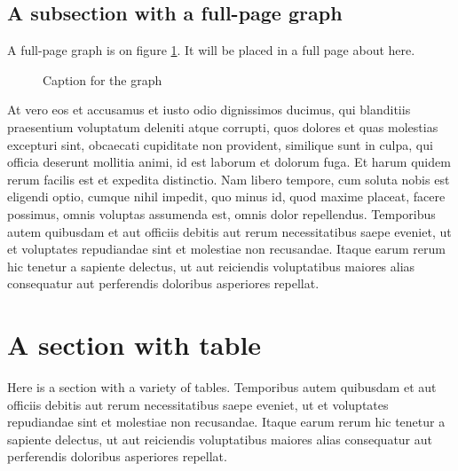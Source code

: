 \documentclass[letterpaper,12pt,leqno]{article}
\newcommand{\pdf}{figures.pdf}
\begin{document}
\subsection{A subsection with a full-page graph}

A full-page graph is on figure \ref{f:graph2}. It will be placed in a full page about here.

\begin{figure}[p]
\hfill
{}\vfig
{}\hfill
{}\vfig
{}\hfill
{}
\caption{Caption for the graph}
\label{f:graph2}\end{figure}

At vero eos et accusamus et iusto odio dignissimos ducimus, qui blanditiis praesentium voluptatum deleniti atque corrupti, quos dolores et quas molestias excepturi sint, obcaecati cupiditate non provident, similique sunt in culpa, qui officia deserunt mollitia animi, id est laborum et dolorum fuga. Et harum quidem rerum facilis est et expedita distinctio. Nam libero tempore, cum soluta nobis est eligendi optio, cumque nihil impedit, quo minus id, quod maxime placeat, facere possimus, omnis voluptas assumenda est, omnis dolor repellendus. Temporibus autem quibusdam et aut officiis debitis aut rerum necessitatibus saepe eveniet, ut et voluptates repudiandae sint et molestiae non recusandae. Itaque earum rerum hic tenetur a sapiente delectus, ut aut reiciendis voluptatibus maiores alias consequatur aut perferendis doloribus asperiores repellat. 

\section{A section with table}

Here is a section with a variety of tables. Temporibus autem quibusdam et aut officiis debitis aut rerum necessitatibus saepe eveniet, ut et voluptates repudiandae sint et molestiae non recusandae. Itaque earum rerum hic tenetur a sapiente delectus, ut aut reiciendis voluptatibus maiores alias consequatur aut perferendis doloribus asperiores repellat. 
\end{document}
